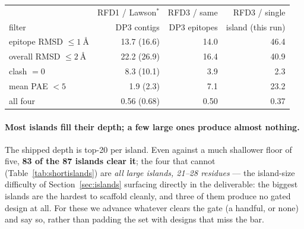 \begin{center}
\begin{tabular}{lrrr}
\toprule
 & RFD1 / Lawson$^{*}$ & RFD3 / same & RFD3 / single \\
filter & DP3 contigs & DP3 epitopes & island (this run) \\
\midrule
epitope RMSD $\le \SI{1}{\angstrom}$ & 13.7 (16.6) & 14.0 & 46.4 \\
overall RMSD $\le \SI{2}{\angstrom}$ & 22.2 (26.9) & 16.4 & 40.9 \\
clash $=0$                           &  8.3 (10.1) &  3.9 &  2.3 \\
mean PAE $<5$                         &  1.9 (2.3)  &  7.1 & 23.2 \\
all four                             & 0.56 (0.68) & 0.50 & 0.37 \\
\bottomrule
\end{tabular}
\label{tab:disentangle}
\end{center}

\paragraph{Most islands fill their depth; a few large ones produce almost nothing.}
The shipped depth is top-\num{20} per island. Even against a much shallower floor of five,
\textbf{83 of the 87 islands clear it}; the four that cannot (Table~\ref{tab:shortislands}) are
\emph{all large islands, 21--28 residues} --- the island-size difficulty of Section~\ref{sec:islands}
surfacing directly in the deliverable: the biggest islands are the hardest to scaffold cleanly, and
three of them produce no gated design at all. For these we advance whatever clears the gate (a handful,
or none) and say so, rather than padding the set with designs that miss the bar.

